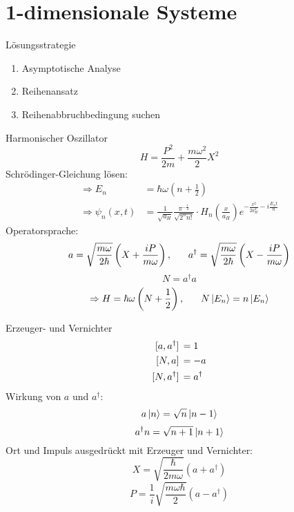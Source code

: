\section{1-dimensionale Systeme}

\begin{subbox}{Lösungsstrategie}
\begin{enumerate}
    \item Asymptotische Analyse
    \item Reihenansatz
    \item Reihenabbruchbedingung suchen
\end{enumerate}
\end{subbox}

\begin{mainbox}{Harmonischer Oszillator}
\[ H = \frac{P^2}{2m} + \frac{m\omega^2}{2} X^2 \]
Schrödinger-Gleichung lösen:
\begin{align*}
    \Rightarrow E_n  &= \hbar \omega (n + \frac{1}{2}) \\
    \Rightarrow \psi_n(x, t) &= \frac{1}{\sqrt{a_H}} \frac{\pi^{-\frac{1}{4}}}{\sqrt{2^n n!}} \cdot H_n \left(\frac{x}{a_H}\right) e^{-\frac{x^2}{2a_H^2}-i\frac{E_nt}{\hbar}}
\end{align*}
Operatorsprache:
\[ a = \sqrt{\frac{m \omega}{2\hbar}} \left(X + \frac{iP}{m\omega}\right), \hspace{0.6cm} a^\dag = \sqrt{\frac{m \omega}{2\hbar}} \left(X - \frac{iP}{m\omega}\right) \]
\[ N = a^\dag a \]
\[\Rightarrow H = \hbar \omega \left(N + \frac{1}{2}\right), \hspace{.6cm} N \ket{E_n} = n \ket{E_n} \]
\end{mainbox}

\begin{subbox}{Erzeuger- und Vernichter}
\begin{align*}
\comm*{a}{a^\dag} &= 1 \\
\comm*{N}{a} &= -a \\
\comm*{N}{a^\dagger} &= a^\dagger
\end{align*}
Wirkung von $a$ und $a^\dagger$: 
\[ a\ket{n} = \sqrt{n} \ket{n-1} \]
\[ a^\dagger{n} = \sqrt{n+1} \ket{n+1} \]
Ort und Impuls ausgedrückt mit Erzeuger und Vernichter:
\[ X = \sqrt{\frac{\hbar}{2m\omega}} (a + a^\dagger) \]
\[ P = \frac{1}{i} \sqrt{\frac{m\omega\hbar}{2}} (a-a^\dagger) \]
\end{subbox}